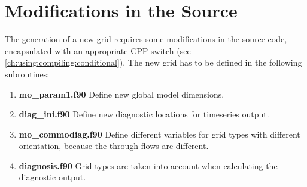 \section[Modifications in the Source]
{\Large{\bf Modifications in the Source}\label{ch:setup:source}}
The generation of a new grid requires some modifications in the source code,
encapsulated with an appropriate CPP switch (see \ref{ch:using:compiling:conditional}).
The new grid has to be defined in the following subroutines:
\begin{enumerate}

\item \textbf{mo\_param1.f90} \newline
Define new global model dimensions.

\item \textbf{diag\_ini.f90} \newline
Define new diagnostic locations for timeseries output.

\item \textbf{mo\_commodiag.f90} \newline
Define different variables for grid types with different orientation, 
because the through-flows are different.

\item \textbf{diagnosis.f90} \newline
Grid types are taken into account 
when calculating the diagnostic output.

\end{enumerate}

\clearpage



  
